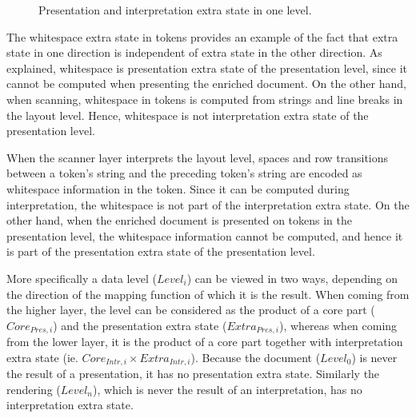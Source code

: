 \begin{figure}
\begin{center}
\begin{center}
\end{center}
\caption{Presentation and interpretation extra state in one level.}\label{levelExtraState} 
\end{center}
\end{figure}

The whitespace extra state in tokens provides an example of the fact that extra state in one direction is independent of extra state in the other direction. As explained, whitespace is presentation extra state of the presentation level, since it cannot be computed when presenting the enriched document. On the other hand, when scanning, whitespace in tokens is computed from strings and line breaks in the layout level. Hence, whitespace is not interpretation extra state of the presentation level.

\bc
When the scanner layer interprets the layout level, spaces and row transitions between a token's string and the preceding token's string are encoded as whitespace information in the token. Since it can be computed during interpretation, the whitespace is not part of the interpretation extra state. On the other hand, when the enriched document is presented on tokens in the presentation level, the whitespace information cannot be computed, and hence it is part of the presentation extra state of the presentation level.
\ec


More specifically a data level ($Level_{i}$) can be viewed in two ways, depending on the direction of the mapping function of which it is the result. When coming from the higher layer, the level can be considered as the product of a core part ($Core_{Pres,i}$) and the presentation extra state ($Extra_{Pres,i}$), whereas when coming from the lower layer, it is the product of a core part together with interpretation extra state (ie. $Core_{Intr,i} \times Extra_{Intr,i}$). Because the document ($Level_0$) is never the result of a presentation, it has no presentation extra state. Similarly the rendering ($Level_n$), which is never the result of an interpretation, has no interpretation extra state.

